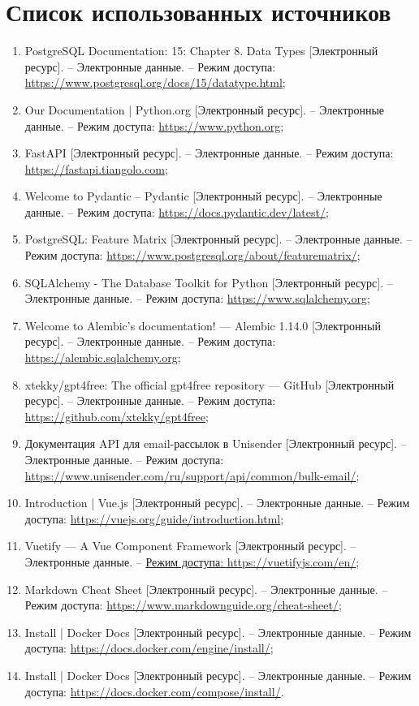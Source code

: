 \clearpage
\section*{Список использованных источников}

\begin{enumerate}
    \item PostgreSQL Documentation: 15: Chapter 8. Data Types [Электронный ресурс]. – Электронные данные. – Режим доступа: \url{https://www.postgresql.org/docs/15/datatype.html};
    \item Our Documentation | Python.org [Электронный ресурс]. – Электронные данные. – Режим доступа: \url{https://www.python.org};
    \item FastAPI [Электронный ресурс]. – Электронные данные. – Режим доступа: \url{https://fastapi.tiangolo.com};
    \item Welcome to Pydantic – Pydantic [Электронный ресурс]. – Электронные данные. – Режим доступа: \url{https://docs.pydantic.dev/latest/};
    \item PostgreSQL: Feature Matrix [Электронный ресурс]. – Электронные данные. – Режим доступа: \url{https://www.postgresql.org/about/featurematrix/};
    \item SQLAlchemy - The Database Toolkit for Python [Электронный ресурс]. – Электронные данные. – Режим доступа: \url{https://www.sqlalchemy.org};
    \item Welcome to Alembic’s documentation! — Alembic 1.14.0 [Электронный ресурс]. – Электронные данные. – Режим доступа: \url{https://alembic.sqlalchemy.org};
    \item xtekky/gpt4free: The official gpt4free repository — GitHub [Электронный ресурс]. – Электронные данные. – Режим доступа: \url{https://github.com/xtekky/gpt4free};
    \item Документация API для email-рассылок в Unisender [Электронный ресурс]. – Электронные данные. – Режим доступа: \url{https://www.unisender.com/ru/support/api/common/bulk-email/};
    \item Introduction | Vue.js [Электронный ресурс]. – Электронные данные. – Режим доступа: \url{https://vuejs.org/guide/introduction.html};
    \item Vuetify — A Vue Component Framework [Электронный ресурс]. – Электронные данные. – \url{Режим доступа: https://vuetifyjs.com/en/};
    \item Markdown Cheat Sheet [Электронный ресурс]. – Электронные данные. – Режим доступа: \url{https://www.markdownguide.org/cheat-sheet/};
    \item Install | Docker Docs [Электронный ресурс]. – Электронные данные. – Режим доступа: \url{https://docs.docker.com/engine/install/};
    \item Install | Docker Docs [Электронный ресурс]. – Электронные данные. – Режим доступа: \url{https://docs.docker.com/compose/install/}.
\end{enumerate}